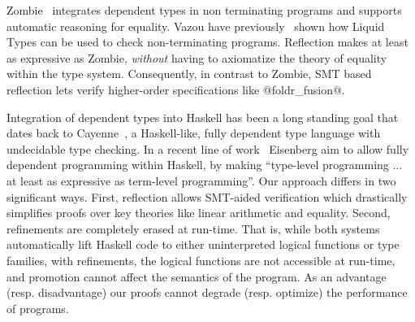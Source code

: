 %


%
Zombie~\citep{Zombie, Sjoberg2015} integrates
dependent types in non terminating programs
and supports automatic reasoning for equality.
%
Vazou \etal have previously~\citep{Vazou14} shown
how Liquid Types can be used to check
non-terminating programs.
%
Reflection makes \toolname at least as
expressive as Zombie, \emph{without}
having to axiomatize the theory of
equality within the type system.
%
Consequently, in contrast to Zombie,
SMT based reflection lets \toolname
verify higher-order specifications
like @foldr_fusion@.

%
%
%

%
Integration of dependent types into Haskell
has been a long standing goal that dates back
to Cayenne~\citep{cayenne}, a Haskell-like,
fully dependent type language with undecidable
type checking.
%
In a recent line of work~\citep{EisenbergS14}
Eisenberg \etal aim to allow fully dependent
programming within Haskell, by making
``type-level programming ... at least as
  expressive as term-level programming''.
%
Our approach differs in two significant ways.
%
First, reflection allows SMT-aided verification
which drastically simplifies proofs over key theories
like linear arithmetic and equality.
%
Second, refinements are completely erased at run-time.
That is, while both systems automatically lift Haskell
code to either uninterpreted logical functions
or type families, with refinements, the logical
functions are not accessible at run-time, and
promotion cannot affect the semantics of
the program.
%
As an advantage (resp. disadvantage) our
proofs cannot degrade (resp. optimize)
the performance of programs.

